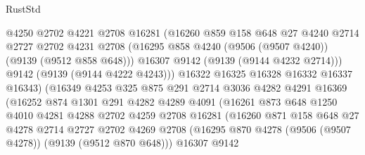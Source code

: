 \begin{lexlean}{RustStd}
\begin{coremodule}
                            @4250
                            @2702
                            @4221
                            @2708
                            @16281
                            (@16260
                              @859
                              @158
                              @648
                              @27
                              @4240
                              @2714
                              @2727
                              @2702
                              @4231
                              @2708
                              (@16295 @858 @4240 (@9506 (@9507 @4240)) (@9139 (@9512 @858 @648)))
                              @16307
                              @9142
                              (@9139 (@9144 @4232 @2714)))
                            @9142
                            (@9139 (@9144 @4222 @4243)))
                          @16322
                          @16325
                          @16328
                          @16332
                          @16337
                          @16343)
                        (@16349
                          @4253
                          @325
                          @875
                          @291
                          @2714
                          @3036
                          @4282
                          @4291
                          @16369
                          (@16252
                            @874
                            @1301
                            @291
                            @4282
                            @4289
                            @4091
                            (@16261
                              @873
                              @648
                              @1250
                              @4010
                              @4281
                              @4288
                              @2702
                              @4259
                              @2708
                              @16281
                              (@16260
                                @871
                                @158
                                @648
                                @27
                                @4278
                                @2714
                                @2727
                                @2702
                                @4269
                                @2708
                                (@16295 @870 @4278 (@9506 (@9507 @4278)) (@9139 (@9512 @870 @648)))
                                @16307
                                @9142

\end{coremodule}
\end{lexlean}
